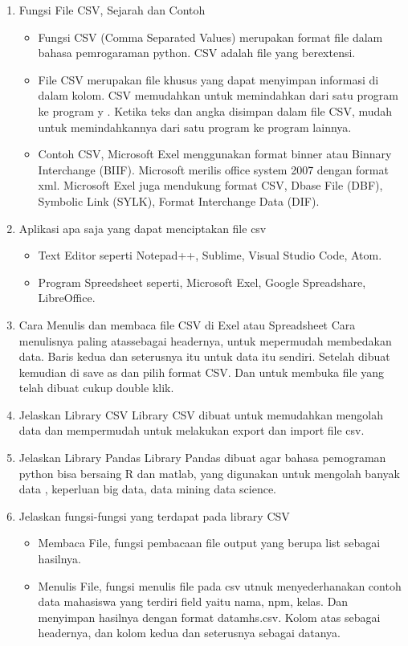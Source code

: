 \begin{enumerate}
\item Fungsi File CSV, Sejarah dan Contoh
\begin{itemize}
    \item Fungsi CSV (Comma Separated Values) merupakan format file dalam bahasa pemrogaraman python. CSV adalah file yang berextensi.
    \item File CSV merupakan file khusus yang dapat menyimpan informasi di dalam kolom. CSV memudahkan untuk memindahkan dari satu program ke program y .  Ketika teks dan angka disimpan dalam file CSV, mudah untuk memindahkannya dari satu program ke program lainnya. 
    \item Contoh CSV, Microsoft Exel menggunakan format binner atau Binnary Interchange (BIIF). Microsoft merilis office system 2007 dengan format xml. Microsoft Exel juga mendukung format CSV, Dbase File (DBF), Symbolic Link (SYLK), Format Interchange Data (DIF).
\end{itemize}

\item Aplikasi apa saja yang dapat menciptakan file csv
\begin{itemize}
    \item Text Editor seperti Notepad++, Sublime, Visual Studio Code, Atom.
    \item Program Spreedsheet seperti, Microsoft Exel, Google Spreadshare, LibreOffice.
\end{itemize}

\item Cara Menulis dan membaca file CSV di Exel atau Spreadsheet
Cara menulisnya paling atassebagai headernya, untuk mepermudah membedakan data. Baris kedua dan seterusnya itu untuk data itu sendiri. Setelah dibuat kemudian di save as dan pilih format CSV. Dan untuk membuka file yang telah dibuat cukup double klik.

\item Jelaskan Library CSV
Library CSV dibuat untuk memudahkan mengolah data dan mempermudah untuk melakukan export dan import file csv.

\item Jelaskan Library Pandas
Library Pandas dibuat agar bahasa pemograman python bisa bersaing R dan matlab, yang digunakan untuk mengolah banyak data , keperluan big data, data mining data science.

\item Jelaskan fungsi-fungsi yang terdapat pada library CSV
\begin{itemize}
    \item Membaca File, fungsi pembacaan file output yang berupa list sebagai hasilnya.
    \item Menulis File, fungsi menulis file pada csv utnuk menyederhanakan contoh data mahasiswa yang terdiri field yaitu nama, npm, kelas. Dan menyimpan hasilnya dengan format datamhs.csv. Kolom atas sebagai headernya, dan kolom kedua dan seterusnya sebagai datanya.
\end{itemize}


\end{enumerate}
